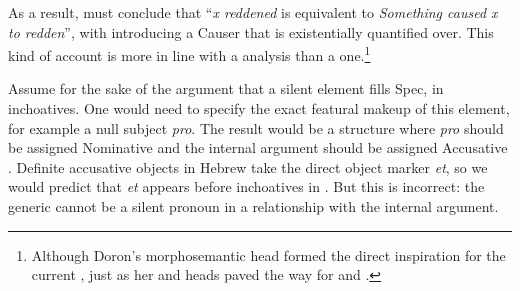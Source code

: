 \begin{exe}
\begin{xlist}
\begin{xlist}
\begin{exe}
\begin{exe}
\begin{xlist}
\begin{exe}
\begin{xlist}
\begin{exe}
\begin{xlist}
\begin{xlist}
\begin{exe}
\begin{xlist}
\begin{exe}
\begin{xlist}
\begin{exe}
\begin{xlist}
\begin{exe}
\begin{exe}
\begin{exe}
\begin{xlist}
\begin{exe}
\begin{exe}
\begin{xlist}
\begin{xlist}
\begin{exe}
\begin{xlist}
\begin{exe}
\begin{exe}
\begin{xlist}
\begin{exe}
\begin{exe}
\begin{xlist}
\begin{exe}
\begin{xlist}
\begin{exe}
\begin{xlist}
\begin{exe}
\begin{xlist}
\begin{exe}
\begin{exe}
\begin{xlist}
\begin{exe}
\begin{exe}
\begin{xlist}
\begin{xlist}
\begin{exe}
\begin{xlist}
\begin{xlist}
\begin{exe}
\begin{xlist}
\begin{exe}
\begin{xlist}
\begin{exe}
\begin{xlist}
\begin{exe}
\begin{xlist}
\begin{exe}
\begin{exe}
\begin{exe}
\begin{exe}
\begin{xlist}
\begin{exe}
\begin{exe}
\begin{xlist}
\begin{xlist}
\begin{exe}
\begin{exe}
\begin{xlist}
\begin{exe}
\begin{xlist}
As a result, \citet[62]{doron03} must conclude that ``\emph{x reddened} is equivalent to \emph{Something caused x to redden}'', with  introducing a Causer that is existentially quantified over. This kind of account is more in line with a  analysis than a  one.\footnote{Although Doron's morphosemantic head formed the direct inspiration for the current {\vd}, just as her  and  heads paved the way for {\vz} and {\va}.}

Assume for the sake of the argument that a silent element fills Spec,{\vd} in inchoatives. One would need to specify the exact featural makeup of this element, for example a null subject \emph{pro}. The result would be a  structure where \emph{pro} should be assigned Nominative  and the internal argument should be assigned Accusative . Definite accusative objects in Hebrew take the direct object marker \emph{et}, so we would predict that \emph{et} appears before inchoatives in \thif. But this is incorrect: the generic  cannot be a silent pronoun in a  relationship with the internal argument.

 \begin{exe}
 \ex  
 \begin{xlist} 
	

\end{xlist}
\end{exe}
\end{xlist}
\end{exe}
\end{xlist}
\end{exe}
\end{exe}
\end{xlist}
\end{xlist}
\end{exe}
\end{exe}
\end{xlist}
\end{exe}
\end{exe}
\end{exe}
\end{exe}
\end{xlist}
\end{exe}
\end{xlist}
\end{exe}
\end{xlist}
\end{exe}
\end{xlist}
\end{exe}
\end{xlist}
\end{xlist}
\end{exe}
\end{xlist}
\end{xlist}
\end{exe}
\end{exe}
\end{xlist}
\end{exe}
\end{exe}
\end{xlist}
\end{exe}
\end{xlist}
\end{exe}
\end{xlist}
\end{exe}
\end{xlist}
\end{exe}
\end{exe}
\end{xlist}
\end{exe}
\end{exe}
\end{xlist}
\end{exe}
\end{xlist}
\end{xlist}
\end{exe}
\end{exe}
\end{xlist}
\end{exe}
\end{exe}
\end{exe}
\end{xlist}
\end{exe}
\end{xlist}
\end{exe}
\end{xlist}
\end{exe}
\end{xlist}
\end{xlist}
\end{exe}
\end{xlist}
\end{exe}
\end{xlist}
\end{exe}
\end{exe}
\end{xlist}
\end{xlist}
\end{exe}
